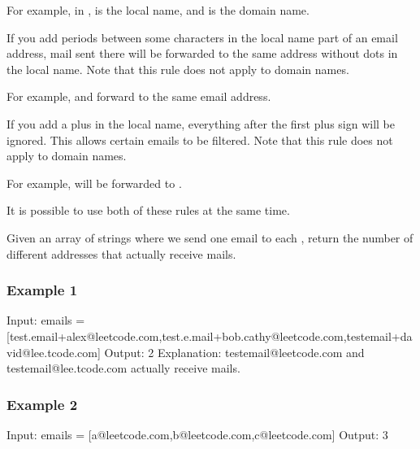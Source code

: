 \documentclass[letterpaper,12pt,english]{book}
\begin{document}
\sphinxAtStartPar
For example, in ,  is the local name, and  is the domain name.

\sphinxAtStartPar
If you add periods  between some characters in the local name part of an email address, mail sent there will be forwarded to the same address without dots in the local name. Note that this rule does not apply to domain names.

\sphinxAtStartPar
For example,  and  forward to the same email address.

\sphinxAtStartPar
If you add a plus \sphinxcode{\sphinxupquote{\textquotesingle{}+\textquotesingle{}}} in the local name, everything after the first plus sign will be ignored. This allows certain emails to be filtered. Note that this rule does not apply to domain names.

\sphinxAtStartPar
For example,  will be forwarded to .

\sphinxAtStartPar
It is possible to use both of these rules at the same time.

\sphinxAtStartPar
Given an array of strings  where we send one email to each , return the number of different addresses that actually receive mails.


\subsubsection{Example 1}
\label{\detokenize{String/08_STR_929_Unique_Email_Addresses:example-1}}
\begin{sphinxVerbatim}[commandchars=\\\{\}]
Input: emails = [\PYGZdq{}test.email+alex@leetcode.com\PYGZdq{},\PYGZdq{}test.e.mail+bob.cathy@leetcode.com\PYGZdq{},\PYGZdq{}testemail+david@lee.tcode.com\PYGZdq{}]
Output: 2
Explanation: \PYGZdq{}testemail@leetcode.com\PYGZdq{} and \PYGZdq{}testemail@lee.tcode.com\PYGZdq{} actually receive mails.
\end{sphinxVerbatim}


\subsubsection{Example 2}
\label{\detokenize{String/08_STR_929_Unique_Email_Addresses:example-2}}
\begin{sphinxVerbatim}[commandchars=\\\{\}]
Input: emails = [\PYGZdq{}a@leetcode.com\PYGZdq{},\PYGZdq{}b@leetcode.com\PYGZdq{},\PYGZdq{}c@leetcode.com\PYGZdq{}]
Output: 3
\end{sphinxVerbatim}
\end{document}
